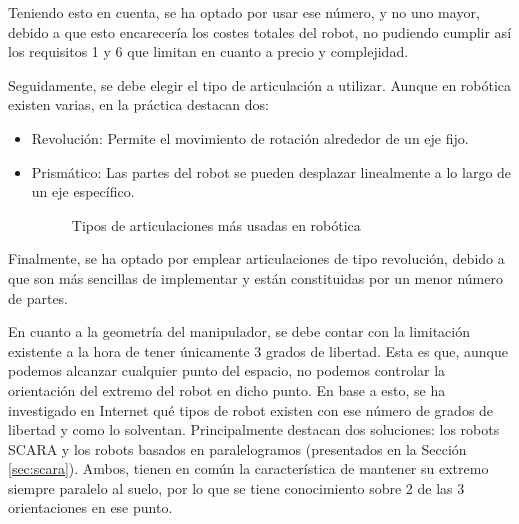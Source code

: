 Teniendo esto en cuenta, se ha optado por usar ese número, y no uno mayor, debido a que esto encarecería los costes totales del robot, no pudiendo cumplir así 
los requisitos 1 y 6 que limitan en cuanto a precio y complejidad. 

Seguidamente, se debe elegir el tipo de articulación a utilizar. Aunque en robótica existen varias, en la práctica destacan dos:
\begin{itemize}
\item Revolución: Permite el movimiento de rotación alrededor de un eje fijo.
\item Prismático: Las partes del robot se pueden desplazar linealmente a lo largo de un eje específico. 

\begin{figure} [h!]
  \centering    
  \hspace{1cm}
  \caption{Tipos de articulaciones más usadas en robótica}
\end{figure}

\end{itemize}

Finalmente, se ha optado por emplear articulaciones de tipo revolución, debido a que son más sencillas de implementar y 
están constituidas por un menor número de partes.

En cuanto a la geometría del manipulador, se debe contar con la limitación existente a la hora de tener únicamente 3 grados de libertad. Esta es 
que, aunque podemos alcanzar cualquier punto del espacio, no podemos controlar la orientación del extremo del robot en dicho punto. En base a esto, 
se ha investigado en Internet qué tipos de robot existen con ese número de grados de libertad y como lo solventan. Principalmente destacan dos 
soluciones: los robots SCARA y los robots basados en paralelogramos (presentados en la Sección \ref{sec:scara}). Ambos, tienen en común la 
característica de mantener su extremo siempre paralelo al suelo, por lo que se tiene conocimiento sobre 2 de las 3 orientaciones en ese punto. 

